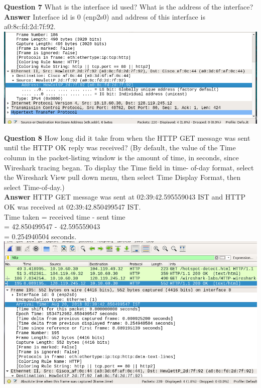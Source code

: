 \documentclass[14pt]{extarticle}
\begin{document}
    \noindent
    \textbf{\large Question 7}
    What is the interface id used? What is the address of the interface?\\[10pt]
    \textbf{\large Answer}
    Interface id is 0 (enp2s0) and address of this interface is a0:8c:fd:2d:7f:92.\\[10pt]
    \includegraphics[scale=0.48]{7}
    \vspace{1cm}

    \noindent
    \textbf{\large Question 8}
    How long did it take from when the HTTP GET message was sent until the HTTP OK reply was
received? (By default, the value of the Time column in the packet-listing window is the
amount of time, in seconds, since Wireshark tracing began. To display the Time field in time-
of-day format, select the Wireshark View pull down menu, then select Time Display Format,
then select Time-of-day.)\\[10pt]
    \textbf{\large Answer}
    HTTP GET message was sent at 02:39:42.595559043 IST and HTTP OK was received at 02:39:42.850499547 IST.\\[8pt]
    Time taken = received time - sent time \\= 42.850499547 - 42.595559043 \\
    = 0.254940504 seconds.\\[10pt]
    \includegraphics[scale=0.48]{8}
    \vspace{1cm}
\end{document}
